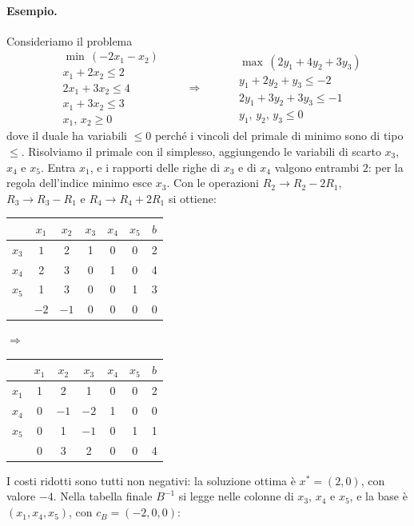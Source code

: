 \paragraph{Esempio.}
Consideriamo il problema
\[
\begin{aligned}
&\min\, (-2x_1 - x_2) \\
&x_1 + 2x_2 \le 2 \\
&2x_1 + 3x_2 \le 4 \\
&x_1 + 3x_2 \le 3 \\
&x_1,\, x_2 \ge 0
\end{aligned}
\qquad\Longrightarrow\qquad
\begin{aligned}
&\max\, (2y_1 + 4y_2 + 3y_3) \\
&y_1 + 2y_2 + y_3 \le -2 \\
&2y_1 + 3y_2 + 3y_3 \le -1 \\
&y_1,\, y_2,\, y_3 \le 0
\end{aligned}
\]
dove il duale ha variabili $\le 0$ perché i vincoli del primale di minimo sono di tipo $\le$. Risolviamo il primale con il simplesso, aggiungendo le variabili di scarto $x_3$, $x_4$ e $x_5$. Entra $x_1$, e i rapporti delle righe di $x_3$ e di $x_4$ valgono entrambi $2$: per la regola dell'indice minimo esce $x_3$. Con le operazioni $R_2 \to R_2 - 2R_1$, $R_3 \to R_3 - R_1$ e $R_4 \to R_4 + 2R_1$ si ottiene:
\begin{center}
\begin{tabular}{c|ccccc|c}
 & $x_1$ & $x_2$ & $x_3$ & $x_4$ & $x_5$ & $b$ \\
\hline
$x_3$ & $\boxed{1}$ & 2 & 1 & 0 & 0 & 2 \\
$x_4$ & 2 & 3 & 0 & 1 & 0 & 4 \\
$x_5$ & 1 & 3 & 0 & 0 & 1 & 3 \\
\hline
 & $-2$ & $-1$ & 0 & 0 & 0 & 0 \\
\end{tabular}
\qquad$\Longrightarrow$\qquad
\begin{tabular}{c|ccccc|c}
 & $x_1$ & $x_2$ & $x_3$ & $x_4$ & $x_5$ & $b$ \\
\hline
$x_1$ & 1 & 2 & 1 & 0 & 0 & 2 \\
$x_4$ & 0 & $-1$ & $-2$ & 1 & 0 & 0 \\
$x_5$ & 0 & 1 & $-1$ & 0 & 1 & 1 \\
\hline
 & 0 & 3 & 2 & 0 & 0 & 4 \\
\end{tabular}
\end{center}
I costi ridotti sono tutti non negativi: la soluzione ottima è $x^* = (2, 0)$, con valore $-4$. Nella tabella finale $B^{-1}$ si legge nelle colonne di $x_3$, $x_4$ e $x_5$, e la base è $(x_1, x_4, x_5)$, con $c_B = (-2, 0, 0)$:
